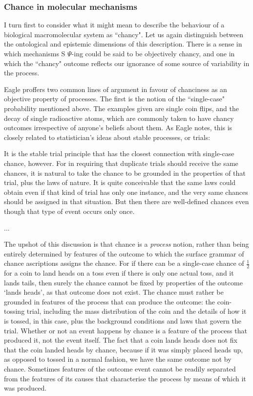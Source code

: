 \subsubsection{Chance in molecular mechanisms}
I turn first to consider what it might mean to describe the behaviour of a biological macromolecular system as ``chancy". Let us again distinguish between the ontological and epistemic dimensions of this description. There is a sense in which mechanisms S $\Psi$-ing could be said to be objectively chancy, and one in which the ``chancy" outcome reflects our ignorance of some source of variability in the process.

Eagle proffers two common lines of argument in favour of chanciness as an objective property of processes. The first is the notion of the ``single-case" probability mentioned above. The examples given are single coin flips, and the decay of single radioactive atoms, which are commonly taken to have chancy outcomes irrespective of anyone's beliefs about them. As Eagle notes, this is closely related to statistician's ideas about stable processes, or trials:

\begin{longquote}
It is the stable trial principle that has the closest connection with single-case chance, however. For in requiring that duplicate trials should receive the same chances, it is natural to take the chance to be grounded in the properties of that trial, plus the laws of nature. It is quite conceivable that the same laws could obtain even if that kind of trial has only one instance, and the very same chances should be assigned in that situation. But then there are well-defined chances even though that type of event occurs only once.

...

The upshot of this discussion is that chance is a \textit{process} notion, rather than being entirely determined by features of the outcome to which the surface grammar of chance ascriptions assigns the chance. For if there can be a single-case chance of $\frac{1}{2}$
for a coin to land heads on a toss even if there is only one actual toss, and it lands tails, then surely the chance cannot be fixed by properties of the outcome ‘lands heads’, as that outcome does not exist. The chance must rather be grounded in features of the process that can produce the outcome: the coin-tossing trial, including the mass distribution of the coin and the details of how it is tossed, in this case, plus the background conditions and laws that govern the trial. Whether or not an event happens by chance is a feature of the process that produced it, not the event itself. The fact that a coin lands heads does not fix that the coin landed heads by chance, because if it was simply placed heads up, as opposed to tossed in a normal fashion, we have the same outcome not by chance. Sometimes features of the outcome event cannot be readily separated from the features of its causes that characterise the process by means of which it was produced. 

\cite{Eagle2018}
\end{longquote}

